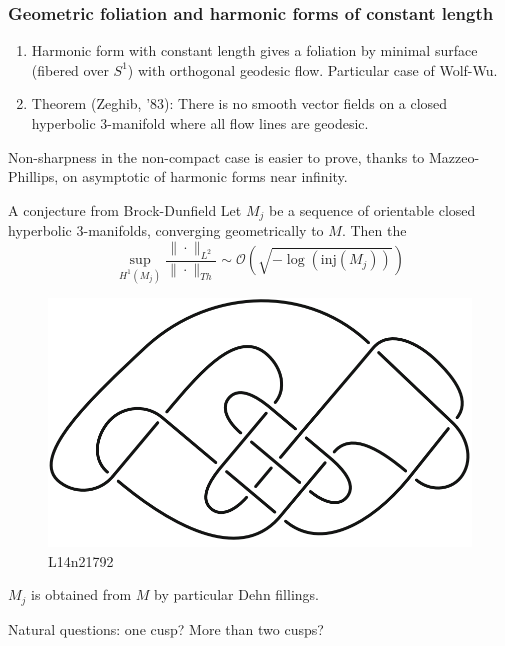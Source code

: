 \documentclass[t]{beamer}
\newcommand{\R}{\mathbb{R}}
\newcommand{\inj}{\text{inj}}
\begin{document}

\begin{frame}
	\frametitle{Geometric foliation and harmonic forms of constant length}
	\begin{enumerate}
		\item Harmonic form with constant length gives a foliation by minimal surface (fibered over $S^1$) with orthogonal geodesic flow. Particular case of Wolf-Wu. 
		\item Theorem (Zeghib, '83): There is no smooth vector fields on a closed hyperbolic $3$-manifold where all flow lines are geodesic. 
	\end{enumerate}
	\vspace{1in}
	Non-sharpness in the non-compact case is easier to prove, thanks to Mazzeo-Phillips, on asymptotic of harmonic forms near infinity. 
\end{frame}

\begin{frame}
	\begin{block}{A conjecture from Brock-Dunfield}
		Let $M_j$ be a sequence of orientable closed hyperbolic $3$-manifolds, converging geometrically to $M$. Then the 
		\begin{equation}
			\sup_{H^1(M_j)} \frac{\|\cdot \|_{L^2}}{\|\cdot \|_{Th}} \sim \mathcal{O}\left({\sqrt{-\log(\inj(M_j))}} \right)	
		\end{equation}
		\begin{figure}
			\includegraphics[scale=0.2]{L14n21792}
			\caption{L14n21792}
		\end{figure}
		$M_j$ is obtained from $M$ by particular Dehn fillings. 
	\end{block}
	Natural questions: one cusp? More than two cusps?
\end{frame}
\end{document}
